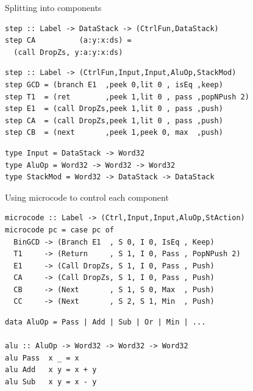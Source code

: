 \documentclass[pdf]{beamer}
\begin{document}
\begin{frame}[fragile]{Splitting into components}
\begin{block}{}
\begin{verbatim}
step :: Label -> DataStack -> (CtrlFun,DataStack)
step CA          (a:y:x:ds) = 
  (call DropZs, y:a:y:x:ds)
\end{verbatim}
\end{block}

\begin{block}{}
\begin{verbatim}
step :: Label -> (CtrlFun,Input,Input,AluOp,StackMod)
step GCD = (branch E1  ,peek 0,lit 0 , isEq ,keep)
step T1  = (ret        ,peek 1,lit 0 , pass ,popNPush 2)
step E1  = (call DropZs,peek 1,lit 0 , pass ,push)
step CA  = (call DropZs,peek 1,lit 0 , pass ,push)
step CB  = (next       ,peek 1,peek 0, max  ,push)
\end{verbatim}

\begin{verbatim}type Input = DataStack -> Word32
type AluOp = Word32 -> Word32 -> Word32
type StackMod = Word32 -> DataStack -> DataStack
\end{verbatim}
\end{block}
\end{frame}

\begin{frame}[fragile]{Using microcode to control each component}
\begin{block}{}
\begin{verbatim}
microcode :: Label -> (Ctrl,Input,Input,AluOp,StAction)
microcode pc = case pc of
  BinGCD -> (Branch E1  , S 0, I 0, IsEq , Keep)
  T1     -> (Return     , S 1, I 0, Pass , PopNPush 2)
  E1     -> (Call DropZs, S 1, I 0, Pass , Push)
  CA     -> (Call DropZs, S 1, I 0, Pass , Push)
  CB     -> (Next       , S 1, S 0, Max  , Push)
  CC     -> (Next       , S 2, S 1, Min  , Push)
\end{verbatim}
\end{block}

\begin{block}{}
\begin{verbatim}
data AluOp = Pass | Add | Sub | Or | Min | ...

alu :: AluOp -> Word32 -> Word32 -> Word32
alu Pass  x _ = x
alu Add   x y = x + y
alu Sub   x y = x - y
\end{verbatim}
\end{block}

\end{frame}
\end{document}
